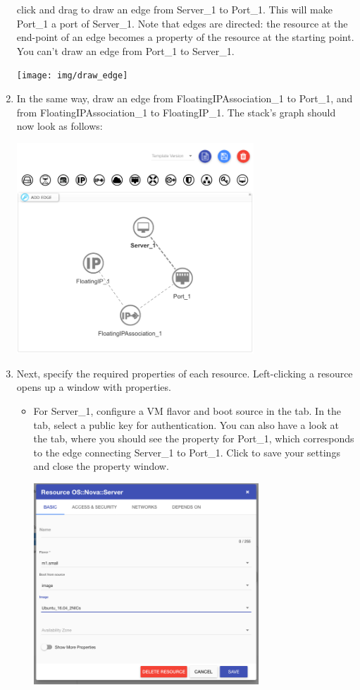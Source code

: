\begin{enumerate}
  click and drag to draw an edge from Server\_1 to Port\_1.  This will
  make Port\_1 a port of Server\_1.  Note that edges are directed: the
  resource at the end-point of an edge becomes a property of the
  resource at the starting point.  You can't draw an edge from Port\_1
  to Server\_1.
  \begin{center}
    \texttt{[image: img/draw\_edge]}
  \end{center}
\item In the same way, draw an edge from FloatingIPAssociation\_1 to
  Port\_1, and from FloatingIPAssociation\_1 to FloatingIP\_1.  The
  stack's graph should now look as follows:
  \begin{center}
    \includegraphics[width=0.7\textwidth]{img/all_resources_connected}
  \end{center}
\item Next, specify the required properties of each resource.
  Left-clicking a resource opens up a window with properties.
  \begin{itemize}
  \item For Server\_1, configure a VM flavor and boot source in the
     tab.  In the  tab, select a public key for authentication.  You
    can also have a look at the  tab, where
    you should see the  property for Port\_1, which
    corresponds to the edge connecting Server\_1 to Port\_1.  Click
     to save your settings and close the
    property window.
    \begin{center}
      \includegraphics[width=0.7\textwidth]{img/server_basic_properties}

\end{center}
\end{itemize}
\end{enumerate}
